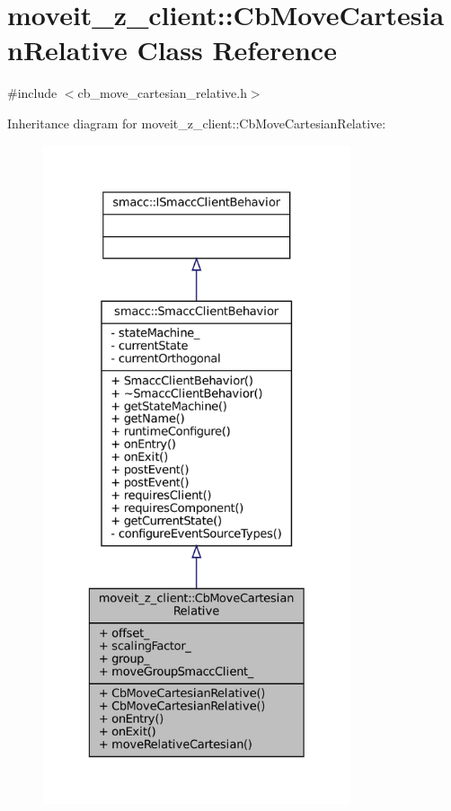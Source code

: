 \hypertarget{classmoveit__z__client_1_1CbMoveCartesianRelative}{}\section{moveit\+\_\+z\+\_\+client\+:\+:Cb\+Move\+Cartesian\+Relative Class Reference}
\label{classmoveit__z__client_1_1CbMoveCartesianRelative}


{\ttfamily \#include $<$cb\+\_\+move\+\_\+cartesian\+\_\+relative.\+h$>$}



Inheritance diagram for moveit\+\_\+z\+\_\+client\+:\+:Cb\+Move\+Cartesian\+Relative\+:
\nopagebreak
\begin{figure}[H]
\begin{center}
\leavevmode
\includegraphics[height=550pt]{classmoveit__z__client_1_1CbMoveCartesianRelative__inherit__graph}
\end{center}
\end{figure}


